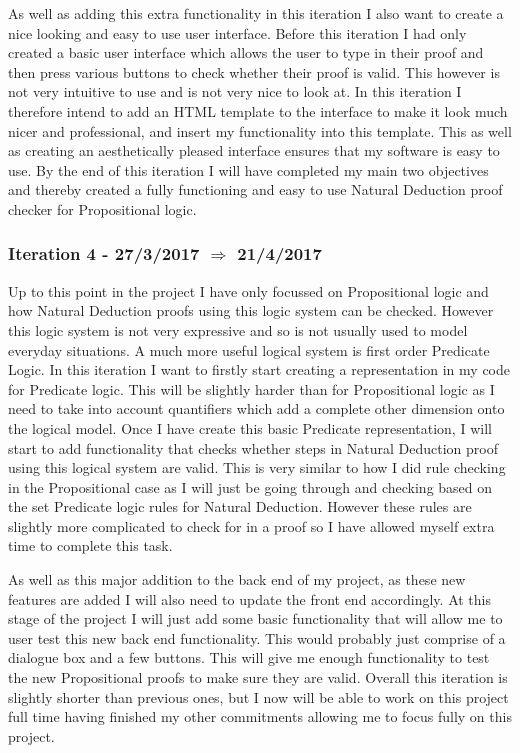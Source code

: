 As well as adding this extra functionality in this iteration I also want to create a nice looking and easy to use user interface. Before this iteration I had only created a basic user interface which allows the user to type in their proof and then press various buttons to check whether their proof is valid. This however is not very intuitive to use and is not very nice to look at. In this iteration I therefore intend to add an HTML template to the interface to make it look much nicer and professional, and insert my functionality into this template. This as well as creating an aesthetically pleased interface ensures that my software is easy to use. By the end of this iteration I will have completed my main two objectives and thereby created a fully functioning and easy to use Natural Deduction proof checker for Propositional logic.

\subsubsection{Iteration 4 - 27/3/2017 $\Rightarrow$ 21/4/2017}

Up to this point in the project I have only focussed on Propositional logic and how Natural Deduction proofs using this logic system can be checked. However this logic system is not very expressive and so is not usually used to model everyday situations. A much more useful logical system is first order Predicate Logic. In this iteration I want to firstly start creating a representation in my code for Predicate logic. This will be slightly harder than for Propositional logic as I need to take into account quantifiers which add a complete other dimension onto the logical model. Once I have create this basic Predicate representation, I will start to add functionality that checks whether steps in Natural Deduction proof using this logical system are valid. This is very similar to how I did rule checking in the Propositional case as I will just be going through and checking based on the set Predicate logic rules for Natural Deduction. However these rules are slightly more complicated to check for in a proof so I have allowed myself extra time to complete this task. 

As well as this major addition to the back end of my project, as these new features are added I will also need to update the front end accordingly. At this stage of the project I will just add some basic functionality that will allow me to user test this new back end functionality. This would probably just comprise of a dialogue box and a few buttons. This will give me enough functionality to test the new Propositional proofs to make sure they are valid. Overall this iteration is slightly shorter than previous ones, but I now will be able to work on this project full time having finished my other commitments allowing me to focus fully on this project. 

